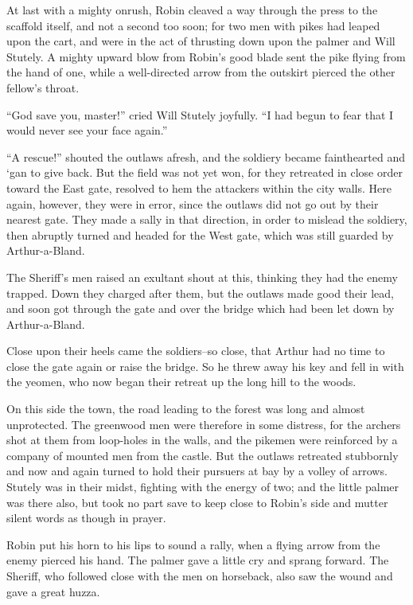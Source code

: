 At last with a mighty onrush, Robin cleaved a way through the press to
the scaffold itself, and not a second too soon; for two men with pikes
had leaped upon the cart, and were in the act of thrusting down upon the
palmer and Will Stutely. A mighty upward blow from Robin's good blade
sent the pike flying from the hand of one, while a well-directed arrow
from the outskirt pierced the other fellow's throat.

``God save you, master!'' cried Will Stutely joyfully. ``I had begun to
fear that I would never see your face again.''

``A rescue!'' shouted the outlaws afresh, and the soldiery became
fainthearted and `gan to give back. But the field was not yet won, for
they retreated in close order toward the East gate, resolved to hem the
attackers within the city walls. Here again, however, they were in
error, since the outlaws did not go out by their nearest gate. They made
a sally in that direction, in order to mislead the soldiery, then
abruptly turned and headed for the West gate, which was still guarded by
Arthur-a-Bland.

The Sheriff's men raised an exultant shout at this, thinking they had
the enemy trapped. Down they charged after them, but the outlaws made
good their lead, and soon got through the gate and over the bridge which
had been let down by Arthur-a-Bland.

Close upon their heels came the soldiers--so close, that Arthur had no
time to close the gate again or raise the bridge. So he threw away his
key and fell in with the yeomen, who now began their retreat up the long
hill to the woods.

On this side the town, the road leading to the forest was long and
almost unprotected. The greenwood men were therefore in some distress,
for the archers shot at them from loop-holes in the walls, and the
pikemen were reinforced by a company of mounted men from the castle. But
the outlaws retreated stubbornly and now and again turned to hold their
pursuers at bay by a volley of arrows. Stutely was in their midst,
fighting with the energy of two; and the little palmer was there also,
but took no part save to keep close to Robin's side and mutter silent
words as though in prayer.

Robin put his horn to his lips to sound a rally, when a flying arrow
from the enemy pierced his hand. The palmer gave a little cry and sprang
forward. The Sheriff, who followed close with the men on horseback, also
saw the wound and gave a great huzza.


